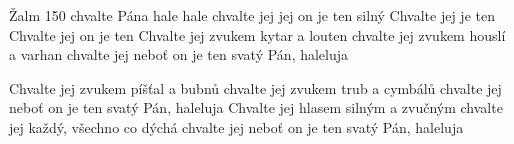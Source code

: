\begin{TEXT}{Žalm 150}
\REFREN   {} chvalte Pána \NL
hale   \NL
hale chvalte   \NL
{} jej   
\SLOKA {} jej  on je ten silný \NL
Chvalte jej   je ten  \NL
Chvalte jej  on je ten    
\SLOKA Chvalte jej zvukem kytar a louten \NL
chvalte jej zvukem houslí a varhan \NL
chvalte jej neboť on je ten svatý Pán, haleluja 

\SLOKA Chvalte jej zvukem píšťal a bubnů \NL
chvalte jej zvukem trub a cymbálů \NL
chvalte jej neboť on je ten svatý Pán, haleluja 
\SLOKA Chvalte jej hlasem silným a zvučným \NL
chvalte jej každý, všechno co dýchá \NL
chvalte jej neboť on je ten svatý Pán, haleluja \NL
\end{TEXT}
